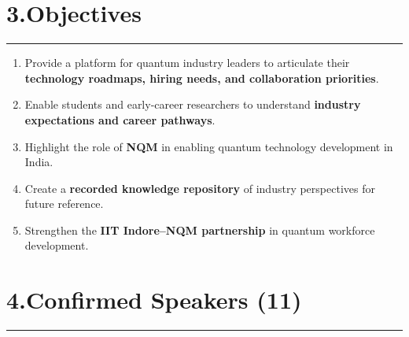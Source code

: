 \documentclass[12pt,a4paper]{article}
\begin{document}
\section*{3.\quad Objectives}
\vspace{-4pt}\hrule\vspace{6pt}

\begin{enumerate}
  \item Provide a platform for quantum industry leaders to articulate their \textbf{technology roadmaps, hiring needs, and collaboration priorities}.
  \item Enable students and early-career researchers to understand \textbf{industry expectations and career pathways}.
  \item Highlight the role of \textbf{NQM} in enabling quantum technology development in India.
  \item Create a \textbf{recorded knowledge repository} of industry perspectives for future reference.
  \item Strengthen the \textbf{IIT Indore--NQM partnership} in quantum workforce development.
\end{enumerate}

\section*{4.\quad Confirmed Speakers (11)}
\vspace{-4pt}\hrule\vspace{6pt}
\end{document}
